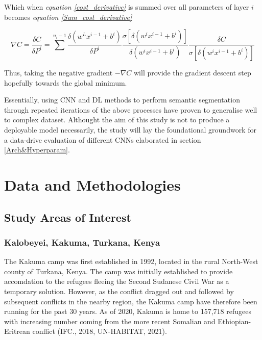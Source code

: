 \documentclass[11pt, a4paper, twoside]{report}
\begin{document}
Which when \textit{equation \ref{cost_derivative}} is summed over all parameters of layer $i$ becomes \textit{equation \ref{Sum_cost_derivative}}\\\par

\begin{equation}
  \label{Sum_cost_derivative}
  \nabla C = \frac{\delta C}{\delta P^{i}} = \sum^{n_{i}-1} \frac{\delta(w^{L}x^{i-1} + b^{i})}{\delta P^{i}} \frac{\sigma[\delta(w^{i}x^{i-1} + b^{i})]}{\delta (w^{i}x^{i-1} + b^{i})} \frac{\delta C}{\sigma[\delta(w^{i}x^{i-1} + b^{i})]}
\end{equation}

Thus, taking the negative gradient $-\nabla C$ will provide the gradient descent step hopefully towards the global minimum.\\\par

Essentially, using CNN and DL methods to perform semantic segmentation through repeated iterations of the above processes have proven to generalise well to complex dataset. Althought the aim of this study is not to produce a deployable model necessarily, the study will lay the foundational groundwork for a data-drive evaluation of different CNNs elaborated in section \ref{Arch&Hyperparam}.\\\par

\newpage

\chapter{Data and Methodologies}\label{DataandMethods}

\section{Study Areas of Interest}\label{AOI}

\subsection{Kalobeyei, Kakuma, Turkana, Kenya}\label{Kalobeyei}

The Kakuma camp was first established in 1992, located in the rural North-West county of Turkana, Kenya. The camp was initially established to provide accomdation to the refugees fleeing the Second Sudanese Civil War as a temporary solution. However, as the conflict dragged out and followed by subsequent conflicts in the nearby region, the Kakuma camp have therefore been running for the past 30 years. As of 2020, Kakuma is home to 157,718 refugees with increasing number coming from the more recent Somalian and Ethiopian-Eritrean conflict (IFC., 2018, UN-HABITAT, 2021).\\\par
\end{document}
